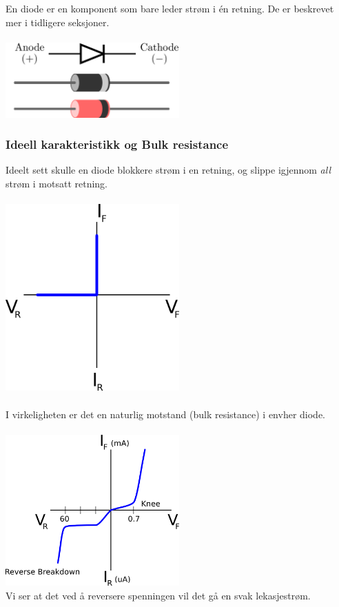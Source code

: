 En diode er en komponent som bare leder strøm i én retning.
De er beskrevet mer i tidligere seksjoner.
\\\\
\includegraphics[width=0.5\textwidth]{./img/dioder}

\subsubsection{Ideell karakteristikk og Bulk resistance}
Ideelt sett skulle en diode blokkere strøm i en retning,
og slippe igjennom \emph{all} strøm i motsatt retning.
\\\\
\includegraphics[width=0.5\textwidth]{./img/diodestrom}
\\\\
I virkeligheten er det en naturlig motstand
(bulk resistance) i envher diode.
\\\\
\includegraphics[width=0.5\textwidth]{./img/diodereell}
\\
Vi ser at det ved å reversere spenningen vil det gå en svak lekasjestrøm.


